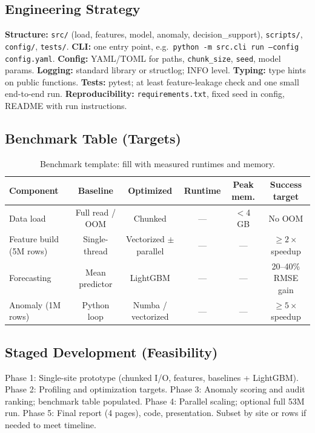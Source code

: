 \documentclass[11pt,a4paper]{article}
\begin{document}
\subsection{Engineering Strategy}
\textbf{Structure:} \texttt{src/} (load, features, model, anomaly, decision\_support), \texttt{scripts/}, \texttt{config/}, \texttt{tests/}. \textbf{CLI:} one entry point, e.g.\ \texttt{python -m src.cli run --config config.yaml}. \textbf{Config:} YAML/TOML for paths, \texttt{chunk\_size}, \texttt{seed}, model params. \textbf{Logging:} standard library or structlog; INFO level. \textbf{Typing:} type hints on public functions. \textbf{Tests:} pytest; at least feature-leakage check and one small end-to-end run. \textbf{Reproducibility:} \texttt{requirements.txt}, fixed seed in config, README with run instructions.

\subsection{Benchmark Table (Targets)}
\begin{table}[h]
\centering
\small
\begin{tabular}{@{}lccccc@{}}
\toprule
\textbf{Component} & \textbf{Baseline} & \textbf{Optimized} & \textbf{Runtime} & \textbf{Peak mem.} & \textbf{Success target} \\
\midrule
Data load & Full read / OOM & Chunked & --- & $<$4\,GB & No OOM \\
Feature build (5M rows) & Single-thread & Vectorized $\pm$ parallel & --- & --- & $\geq 2\times$ speedup \\
Forecasting & Mean predictor & LightGBM & --- & --- & 20--40\% RMSE gain \\
Anomaly (1M rows) & Python loop & Numba / vectorized & --- & --- & $\geq 5\times$ speedup \\
\bottomrule
\end{tabular}
\caption{Benchmark template: fill with measured runtimes and memory.}
\end{table}

\subsection{Staged Development (Feasibility)}
Phase 1: Single-site prototype (chunked I/O, features, baselines + LightGBM). Phase 2: Profiling and optimization targets. Phase 3: Anomaly scoring and audit ranking; benchmark table populated. Phase 4: Parallel scaling; optional full 53M run. Phase 5: Final report (4 pages), code, presentation. Subset by site or rows if needed to meet timeline.
\end{document}
